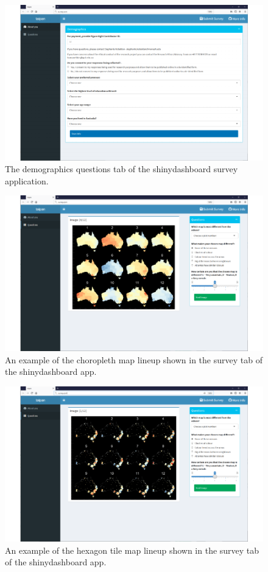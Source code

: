 \documentclass{monashthesis}
\begin{document}
\begin{figure}[H]
\centering
\includegraphics[width=16cm]{lineups/survey-demogs-1.pdf}
\caption{\label{fig:survey-demogs}The demographics questions tab of the shinydashboard survey application.}
\end{figure}

\begin{figure}[H]
\centering
\includegraphics[width=16cm]{lineups/survey-choro-1.pdf}
\caption{\label{fig:survey-choro}An example of the choropleth map lineup shown in the survey tab of the shinydashboard app.}
\end{figure}

\begin{figure}[H]
\centering
\includegraphics[width=16cm]{lineups/survey-hex-1.pdf}
\caption{\label{fig:survey-hex}An example of the hexagon tile map lineup shown in the survey tab of the shinydashboard app.}
\end{figure}
\end{document}
